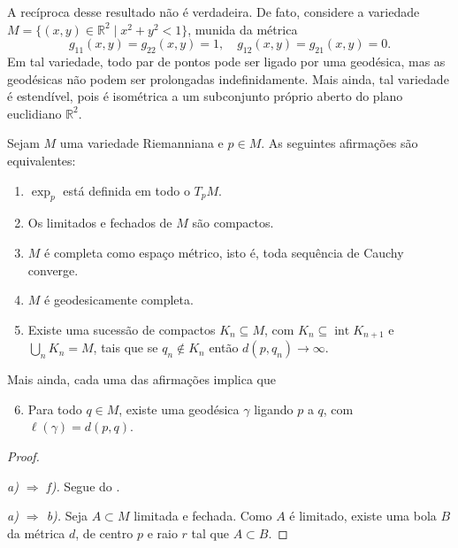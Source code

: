 \begin{observation}
    A recíproca desse resultado não é verdadeira. De fato, considere a variedade $M = \{(x,y) \in \mathbb{R}^2 \mid x^2 + y^2 < 1\}$, munida da métrica
    \begin{equation*}
        g_{11}(x,y) = g_{22}(x,y) = 1, \quad g_{12}(x,y) = g_{21}(x,y) = 0.
    \end{equation*}
    Em tal variedade, todo par de pontos pode ser ligado por uma geodésica, mas as geodésicas não podem ser prolongadas indefinidamente. Mais ainda, tal variedade é estendível, pois é isométrica a um subconjunto próprio aberto do plano euclidiano $\mathbb{R}^2$.
\end{observation}

\begin{theorem}
    \label{teo:hopf-rinow}
    Sejam $M$ uma variedade Riemanniana e $p \in M$. As seguintes afirmações são equivalentes:

    \begin{enumerate}[label=(\alph*)]
        \item $\exp_p$ está definida em todo o $T_pM$.
        \item Os limitados e fechados de $M$ são compactos.
        \item $M$ é completa como espaço métrico, isto é, toda sequência de Cauchy converge.
        \item $M$ é geodesicamente completa.
        \item Existe uma sucessão de compactos $K_n \subseteq M$, com $K_n \subseteq \operatorname{int} K_{n+1}$ e $\bigcup_n K_n = M$, tais que se $q_n \notin K_n$ então $d(p, q_n) \to \infty$.
    \end{enumerate}

    Mais ainda, cada uma das afirmações implica que

    \begin{enumerate}[label=(\alph*)]
        \setcounter{enumi}{5}
        \item Para todo $q \in M$, existe uma geodésica $\gamma$ ligando $p$ a $q$, com $\ell(\gamma) = d(p,q)$.
    \end{enumerate}
    \begin{proof}
        $ $

        \emph{a) $\Rightarrow$ f).} Segue do .

        \emph{a) $\Rightarrow$ b).} Seja $A \subset M$ limitada e fechada. Como $A$ é limitado, existe uma bola $B$ da métrica $d$, de centro $p$ e raio $r$ tal que $A \subset B$.


\end{proof}
\end{theorem}
